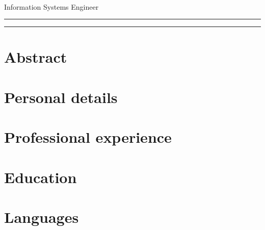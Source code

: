\documentclass[10pt,a4paper]{article}
\begin{document}
\thispagestyle{empty}

\begin{flushright}
    \huge{\textbf{\name}} \\
    \large{Information Systems Engineer}
\end{flushright}
\hrule
\bigskip



\bigskip
\hrule

\bigskip

\section*{Abstract}


\section*{Personal details}


\section*{Professional experience}


\section*{Education}


\section*{Languages}

\end{document}

